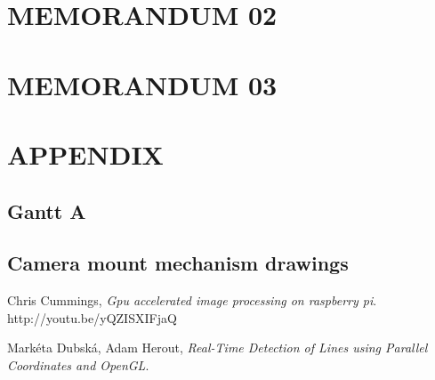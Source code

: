 \documentclass[paper=A4, fontsize=11pt, titlepage]{article}
\numberwithin{equation}{section}
\numberwithin{figure}{section}
\numberwithin{table}{section}
\newcommand*{\sectionpostamble}{}
\newcommand*{\fromto}[1]{\def\sectionpostamble{#1}}
\begin{document}




\clearpage


\fromto{May 5 - May 9}
\section{MEMORANDUM 02}




\clearpage


\fromto{May 12 - May 16}
\section{MEMORANDUM 03}




\clearpage

\section{APPENDIX}
\subsection{Gantt A}

\subsection{Camera mount mechanism drawings}



\clearpage

\begin{thebibliography}{9}
	Chris Cummings,
	\emph{Gpu accelerated image processing on raspberry pi}. http://youtu.be/yQZISXIFjaQ

	Markéta Dubská, Adam Herout,
	\emph{Real-Time Detection of Lines using Parallel Coordinates and OpenGL}. 

\end{thebibliography}
\end{document}
